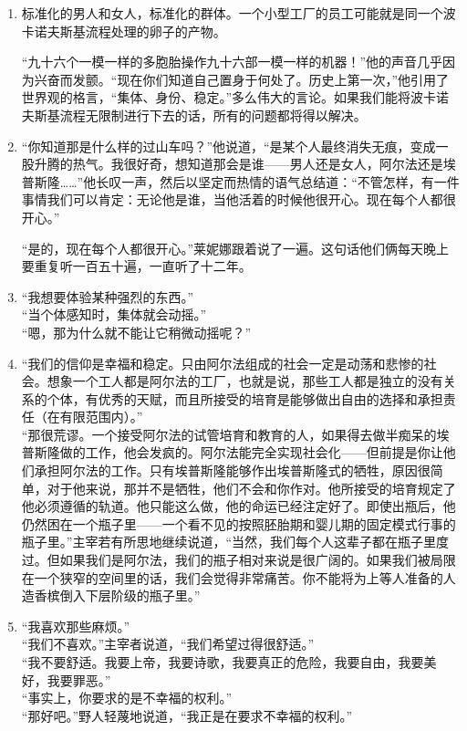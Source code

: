 \documentclass[UTF8]{ctexart}
\begin{document}
			\begin{enumerate}
				\item 标准化的男人和女人，标准化的群体。一个小型工厂的员工可能就是同一个波卡诺夫斯基流程处理的卵子的产物。
				
				“九十六个一模一样的多胞胎操作九十六部一模一样的机器！”他的声音几乎因为兴奋而发颤。“现在你们知道自己置身于何处了。历史上第一次，”他引用了世界观的格言，“集体、身份、稳定。”多么伟大的言论。如果我们能将波卡诺夫斯基流程无限制进行下去的话，所有的问题都将得以解决。
				
				\item “你知道那是什么样的过山车吗？”他说道，“是某个人最终消失无痕，变成一股升腾的热气。我很好奇，想知道那会是谁——男人还是女人，阿尔法还是埃普斯隆……”他长叹一声，然后以坚定而热情的语气总结道：“不管怎样，有一件事情我们可以肯定：无论他是谁，当他活着的时候他很开心。现在每个人都很开心。”
				
				“是的，现在每个人都很开心。”莱妮娜跟着说了一遍。这句话他们俩每天晚上要重复听一百五十遍，一直听了十二年。
				
				\item “我想要体验某种强烈的东西。”
				\\ “当个体感知时，集体就会动摇。”
				\\ “嗯，那为什么就不能让它稍微动摇呢？”
				
				\item “我们的信仰是幸福和稳定。只由阿尔法组成的社会一定是动荡和悲惨的社会。想象一个工人都是阿尔法的工厂，也就是说，那些工人都是独立的没有关系的个体，有优秀的天赋，而且所接受的培育是能够做出自由的选择和承担责任（在有限范围内）。”
				\\ “那很荒谬。一个接受阿尔法的试管培育和教育的人，如果得去做半痴呆的埃普斯隆做的工作，他会发疯的。阿尔法能完全实现社会化——但前提是你让他们承担阿尔法的工作。只有埃普斯隆能够作出埃普斯隆式的牺牲，原因很简单，对于他来说，那并不是牺牲，他们不会和你作对。他所接受的培育规定了他必须遵循的轨道。他只能这么做，他的命运已经注定好了。即使出瓶后，他仍然困在一个瓶子里——一个看不见的按照胚胎期和婴儿期的固定模式行事的瓶子里。”主宰若有所思地继续说道，“当然，我们每个人这辈子都在瓶子里度过。但如果我们是阿尔法，我们的瓶子相对来说是很广阔的。如果我们被局限在一个狭窄的空间里的话，我们会觉得非常痛苦。你不能将为上等人准备的人造香槟倒入下层阶级的瓶子里。”
				
				\item “我喜欢那些麻烦。”
				\\ “我们不喜欢。”主宰者说道，“我们希望过得很舒适。”
				\\ “我不要舒适。我要上帝，我要诗歌，我要真正的危险，我要自由，我要美好，我要罪恶。”
				\\ “事实上，你要求的是不幸福的权利。”
				\\ “那好吧。”野人轻蔑地说道，“我正是在要求不幸福的权利。”
				

\end{enumerate}
\end{document}
